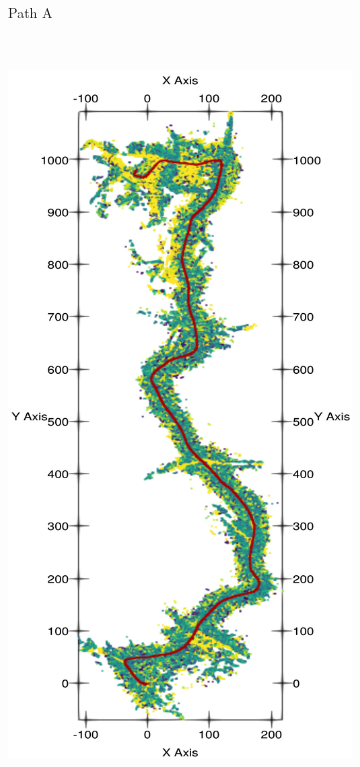 \begin{figure}[htpb]
\begin{center}
\begin{subfigure}[b]{0.32\textwidth}
			\label{fig:ltr_a}
			\caption{Path A}
		\end{subfigure}%
		~
		\begin{subfigure}[b]{0.32\textwidth}
			\includegraphics[width=\linewidth]{figs/ltr_map_traj/path_b.pdf}

\end{subfigure}
\end{center}
\end{figure}

